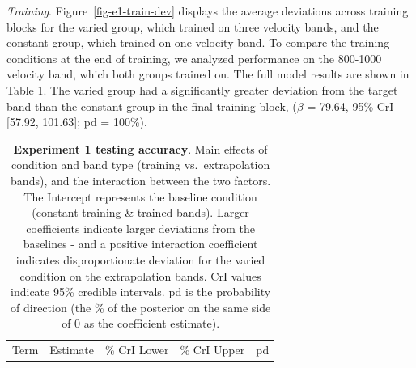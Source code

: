 \documentclass[
  11pt,
  letterpaper,
]{article}
\begin{document}
\hfill\break

\emph{Training}. Figure~\ref{fig-e1-train-dev} displays the average
deviations across training blocks for the varied group, which trained on
three velocity bands, and the constant group, which trained on one
velocity band. To compare the training conditions at the end of
training, we analyzed performance on the 800-1000 velocity band, which
both groups trained on. The full model results are shown in Table 1. The
varied group had a significantly greater deviation from the target band
than the constant group in the final training block, (\(\beta\) = 79.64,
95\% CrI {[}57.92, 101.63{]}; pd = 100\%).

\begin{longtable}[]{@{}
  >{\raggedright\arraybackslash}p{}
  >{\raggedleft\arraybackslash}p{}
  >{\raggedleft\arraybackslash}p{}
  >{\raggedleft\arraybackslash}p{}
  >{\raggedleft\arraybackslash}p{}@{}}
\caption{\textbf{Experiment 1 testing accuracy}. Main effects of
condition and band type (training vs.~extrapolation bands), and the
interaction between the two factors. The Intercept represents the
baseline condition (constant training \& trained bands). Larger
coefficients indicate larger deviations from the baselines - and a
positive interaction coefficient indicates disproportionate deviation
for the varied condition on the extrapolation bands. CrI values indicate
95\% credible intervals. pd is the probability of direction (the \% of
the posterior on the same side of 0 as the coefficient
estimate).}\label{tbl-e1-bmm-dist}\tabularnewline
\toprule\noalign{}
\begin{minipage}[b]{\linewidth}\raggedright
Term
\end{minipage} & \begin{minipage}[b]{\linewidth}\raggedleft
Estimate
\end{minipage} & \begin{minipage}[b]{\linewidth}\raggedleft
95\% CrI Lower
\end{minipage} & \begin{minipage}[b]{\linewidth}\raggedleft
95\% CrI Upper
\end{minipage} & \begin{minipage}[b]{\linewidth}\raggedleft
pd
\end{minipage} \\

\end{longtable}
\end{document}
